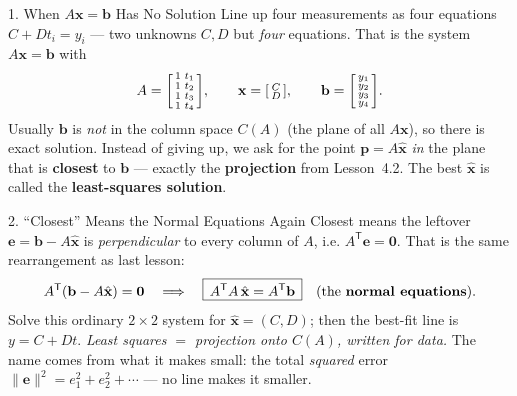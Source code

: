 \documentclass[10pt]{article}
\newcommand{\xx}{\mathbf{x}}
\newcommand{\bb}{\mathbf{b}}
\newcommand{\pp}{\mathbf{p}}
\newcommand{\ee}{\mathbf{e}}
\newcommand{\zero}{\mathbf{0}}
\newcommand{\T}{\mathsf{T}}
\begin{document}
\begin{notesbox}{1. When $A\xx=\bb$ Has No Solution}
Line up four measurements as four equations $C+Dt_i=y_i$ --- two unknowns $C,D$ but \emph{four}
equations. That is the system $A\xx=\bb$ with
\[
  A=\begin{bsmallmatrix} 1 & t_1\\ 1 & t_2\\ 1 & t_3\\ 1 & t_4 \end{bsmallmatrix},\qquad
  \xx=\begin{bsmallmatrix} C\\ D \end{bsmallmatrix},\qquad
  \bb=\begin{bsmallmatrix} y_1\\ y_2\\ y_3\\ y_4 \end{bsmallmatrix}.
\]
Usually $\bb$ is \emph{not} in the column space $C(A)$ (the plane of all $A\xx$), so there is
\blank{2.6cm} exact solution. Instead of giving up, we ask for the point $\pp=A\hat{\xx}$ \emph{in} the
plane that is \textbf{closest} to $\bb$ --- exactly the \textbf{projection} from Lesson~4.2. The best
$\hat{\xx}$ is called the \textbf{least-squares solution}.
\end{notesbox}

\begin{notesbox}{2. ``Closest'' Means the Normal Equations Again}
Closest means the leftover $\ee=\bb-A\hat{\xx}$ is \emph{perpendicular} to every column of $A$, i.e.
$A^{\T}\ee=\zero$. That is the same rearrangement as last lesson:
\[
  A^{\T}(\bb-A\hat{\xx})=\zero \quad\Longrightarrow\quad
  \boxed{\,A^{\T}A\,\hat{\xx}=A^{\T}\bb\,}\quad\text{(the \textbf{normal equations}).}
\]
Solve this ordinary $2\times2$ system for $\hat{\xx}=(C,D)$; then the best-fit line is $y=C+Dt$.
\emph{Least squares $=$ projection onto $C(A)$, written for data.} The name comes from what it makes
small: the total \emph{squared} error $\|\ee\|^2=e_1^2+e_2^2+\cdots$ --- no line makes it smaller.
\end{notesbox}
\end{document}
